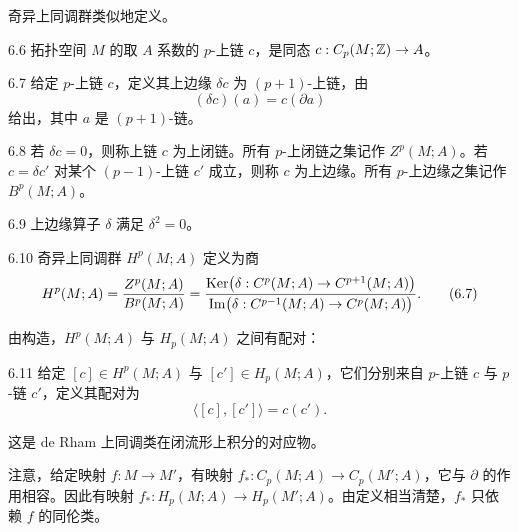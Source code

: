 奇异上同调群类似地定义。

\begin{definition}{6.6}
  拓扑空间 $M$ 的取 $A$ 系数的 $p$-上链 $c$，是同态 $c:C_p(M;\mathbb{Z})\to A$。
\end{definition}

\begin{definition}{6.7}
  给定 $p$-上链 $c$，定义其上边缘 $\delta c$ 为 $(p+1)$-上链，由
  \begin{equation}
    (\delta c)(a)=c(\partial a)
    \tag{6.6}
  \end{equation}
  给出，其中 $a$ 是 $(p+1)$-链。
\end{definition}

\begin{definition}{6.8}
  若 $\delta c=0$，则称上链 $c$ 为上闭链。所有 $p$-上闭链之集记作 $Z^p(M;A)$。若 $c=\delta c'$ 对某个 $(p-1)$-上链 $c'$ 成立，则称 $c$ 为上边缘。所有 $p$-上边缘之集记作 $B^p(M;A)$。
\end{definition}

\begin{proposition}{6.9}
  上边缘算子 $\delta$ 满足 $\delta^2=0$。
\end{proposition}

\begin{definition}{6.10}
  奇异上同调群 $H^p(M;A)$ 定义为商
  \begin{equation}
    H^p(M;A)=\frac{Z^p(M;A)}{B^p(M;A)}
    =\frac{\operatorname{Ker}\bigl(\delta:C^p(M;A)\to C^{p+1}(M;A)\bigr)}
    {\operatorname{Im}\bigl(\delta:C^{p-1}(M;A)\to C^p(M;A)\bigr)}.
    \tag{6.7}
  \end{equation}
\end{definition}

由构造，$H^p(M;A)$ 与 $H_p(M;A)$ 之间有配对：

\begin{definition}{6.11}
  给定 $[c]\in H^p(M;A)$ 与 $[c']\in H_p(M;A)$，它们分别来自 $p$-上链 $c$ 与 $p$-链 $c'$，定义其配对为
  \begin{equation}
    \langle[c],[c']\rangle=c(c').
    \tag{6.8}
  \end{equation}
\end{definition}

这是 de Rham 上同调类在闭流形上积分的对应物。

注意，给定映射 $f:M\to M'$，有映射 $f_*:C_p(M;A)\to C_p(M';A)$，它与 $\partial$ 的作用相容。因此有映射 $f_*:H_p(M;A)\to H_p(M';A)$。由定义相当清楚，$f_*$ 只依赖 $f$ 的同伦类。

